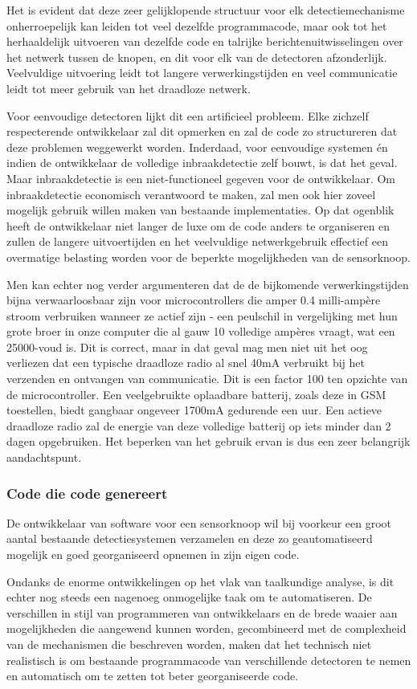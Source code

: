 \documentclass[DIV=calc,paper=a4,fontsize=11pt,twocolumn]{scrartcl}
\newcommand{\heading}[1]{
\vspace{-5mm}
\subsubsection*{#1}
\vspace{-2mm}
}
\begin{document}
Het is evident dat deze zeer gelijklopende structuur voor elk
detectiemechanisme onherroepelijk kan leiden tot veel dezelfde programmacode,
maar ook tot het herhaaldelijk uitvoeren van dezelfde code en talrijke
berichtenuitwisselingen over het netwerk tussen de knopen, en dit voor elk van
de detectoren afzonderlijk. Veelvuldige uitvoering leidt tot langere
verwerkingstijden en veel communicatie leidt tot meer gebruik van het draadloze
netwerk.

Voor eenvoudige detectoren lijkt dit een artificieel probleem. Elke zichzelf
respecterende ontwikkelaar zal dit opmerken en zal de code zo structureren dat
deze problemen weggewerkt worden. Inderdaad, voor eenvoudige systemen \'en
indien de ontwikkelaar de volledige inbraakdetectie zelf bouwt, is dat het
geval. Maar inbraakdetectie is een niet-functioneel gegeven voor de
ontwikkelaar. Om inbraakdetectie economisch verantwoord te maken, zal men ook
hier zoveel mogelijk gebruik willen maken van bestaande implementaties. Op dat
ogenblik heeft de ontwikkelaar niet langer de luxe om de code anders te
organiseren en zullen de langere uitvoertijden en het veelvuldige
netwerkgebruik effectief een overmatige belasting worden voor de beperkte
mogelijkheden van de sensorknoop.

Men kan echter nog verder argumenteren dat de de bijkomende verwerkingstijden
bijna verwaarloosbaar zijn voor microcontrollers die amper 0.4 milli-amp\`ere
stroom verbruiken wanneer ze actief zijn - een peulschil in vergelijking met
hun grote broer in onze computer die al gauw 10 volledige amp\`eres vraagt, wat
een 25000-voud is. Dit is correct, maar in dat geval mag men niet uit het oog
verliezen dat een typische draadloze radio al snel 40mA verbruikt bij het
verzenden en ontvangen van communicatie. Dit is een factor 100 ten opzichte van
de microcontroller. Een veelgebruikte oplaadbare batterij, zoals deze in GSM
toestellen, biedt gangbaar ongeveer 1700mA gedurende een uur. Een actieve
draadloze radio zal de energie van deze volledige batterij op iets minder dan 2
dagen opgebruiken. Het beperken van het gebruik ervan is dus een zeer
belangrijk aandachtspunt.

\heading{Code die code genereert}

De ontwikkelaar van software voor een sensorknoop wil bij voorkeur een groot
aantal bestaande detectiesystemen verzamelen en deze zo geautomatiseerd
mogelijk en goed georganiseerd opnemen in zijn eigen code.

Ondanks de enorme ontwikkelingen op het vlak van taalkundige analyse, is dit
echter nog steeds een nagenoeg onmogelijke taak om te automatiseren. De
verschillen in stijl van programmeren van ontwikkelaars en de brede waaier aan
mogelijkheden die aangewend kunnen worden, gecombineerd met de complexheid van
de mechanismen die beschreven worden, maken dat het technisch niet realistisch
is om bestaande programmacode van verschillende detectoren te nemen en
automatisch om te zetten tot beter georganiseerde code.
\end{document}
